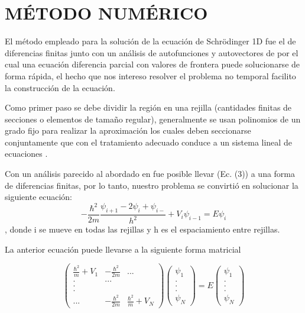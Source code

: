 \documentclass[9pt,twocolumn,twoside]{osajnl}
\begin{document}
\section{MÉTODO NUMÉRICO}

El método empleado para la solución de la ecuación de Schrödinger 1D fue el de diferencias finitas junto con un análisis de autofunciones y autovectores de por el cual una ecuación diferencia parcial con valores de frontera puede solucionarse de forma rápida, el hecho que nos intereso resolver el problema no temporal facilito la construcción de la ecuación.

Como primer paso se debe dividir la región en una rejilla (cantidades finitas de secciones o elementos de tamaño regular), generalmente se usan polinomios de un grado fijo para realizar la aproximación los cuales deben seccionarse conjuntamente que con el tratamiento adecuado conduce a un sistema lineal de ecuaciones \cite{RichardL.Burden}.

Con un análisis parecido al abordado en \cite{PaulL1993} fue posible llevar (Ec. (3)) a una forma de diferencias finitas, por lo tanto, nuestro problema se convirtió en solucionar la siguiente ecuación: $$ - \frac{\hbar^2}{2m} \frac{\psi_{i+1} - 2\psi_{i} + \psi_{i-}}{h^2} + V_i \psi_{i-1} = E \psi_{i}$$ , donde i se mueve en todas las rejillas y h es el espaciamiento entre rejillas.

La anterior ecuación puede llevarse a la siguiente forma matricial 

\begin{equation}
\begin{pmatrix}
\frac{\hbar^2}{m} + V_1 & -\frac{\hbar^2}{2m} & ...\\
 .&...  & \\
 .& & \\
 .& &\\
 ...& -\frac{\hbar^2}{2m} & \frac{\hbar^2}{m} + V_N 
\end{pmatrix}\begin{pmatrix}
\psi_1 \\
.\\
.\\
.\\
\psi_N
\end{pmatrix} = E\begin{pmatrix}
\psi_1 \\
.\\
.\\
.\\
\psi_N
\end{pmatrix}
\end{equation}
\end{document}
